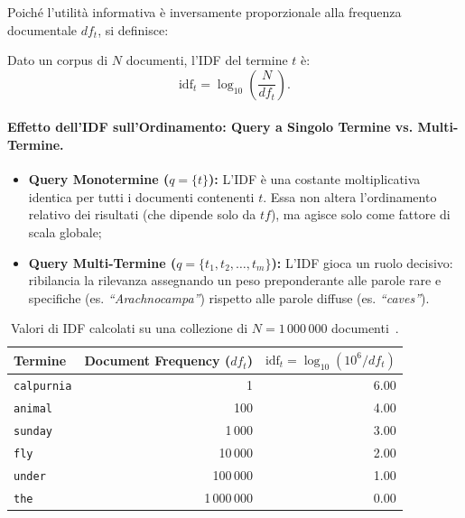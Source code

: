 Poich\'e l'utilit\`a informativa \`e inversamente proporzionale alla frequenza documentale $df_t$, si definisce:

\begin{definition}
Dato un corpus di $N$ documenti, l'IDF del termine $t$ \`e:
\begin{equation}
\text{idf}_t = \log_{10} \left( \frac{N}{df_t} \right).
\label{eq:idf-standard}
\end{equation}
\end{definition}

\paragraph{Effetto dell'IDF sull'Ordinamento: Query a Singolo Termine vs. Multi-Termine.}
\begin{itemize}
    \item \textbf{Query Monotermine ($q = \{t\}$):} L'IDF \`e una costante moltiplicativa identica per tutti i documenti contenenti $t$. Essa non altera l'ordinamento relativo dei risultati (che dipende solo da $tf$), ma agisce solo come fattore di scala globale;
    \item \textbf{Query Multi-Termine ($q = \{t_1, t_2, \dots, t_m\}$):} L'IDF gioca un ruolo decisivo: ribilancia la rilevanza assegnando un peso preponderante alle parole rare e specifiche (es. \textit{``Arachnocampa''}) rispetto alle parole diffuse (es. \textit{``caves''}).
\end{itemize}

\begin{table}[H]
\centering
\small
\begin{tabular}{l r r}
\toprule
\textbf{Termine} & \textbf{Document Frequency ($df_t$)} & \textbf{$\text{idf}_t = \log_{10}(10^6 / df_t)$} \\
\midrule
\texttt{calpurnia} & 1 & 6.00 \\
\texttt{animal}     & 100 & 4.00 \\
\texttt{sunday}     & 1\,000 & 3.00 \\
\texttt{fly}        & 10\,000 & 2.00 \\
\texttt{under}      & 100\,000 & 1.00 \\
\texttt{the}        & 1\,000\,000 & 0.00 \\
\bottomrule
\end{tabular}
\caption{Valori di IDF calcolati su una collezione di $N = 1\,000\,000$ documenti~\cite{manning2008}.}
\label{tab:idf-values}
\end{table}

